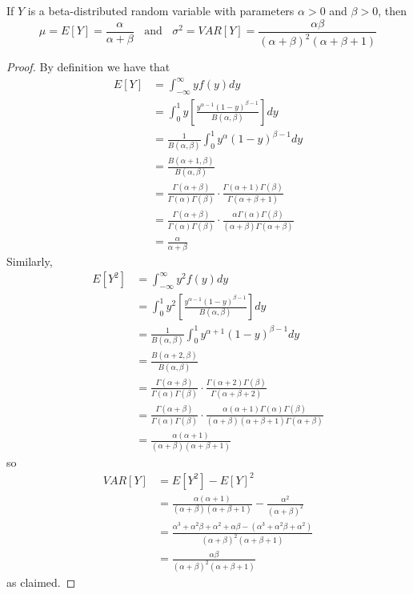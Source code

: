 \documentclass[12pt, a4paper, twoside, openright, titlepage]{book}
\begin{document}
\begin{thm}{}{}
    If $Y$ is a beta-distributed random variable with parameters $\alpha > 0$ and $\beta > 0$, then \begin{equation*}
        \mu = E[Y] = \frac{\alpha}{\alpha + \beta} \;\;\text{ and }\;\;\sigma^2 = VAR[Y] = \frac{\alpha\beta}{(\alpha+\beta)^2(\alpha+\beta+1)}
    \end{equation*}
\end{thm}
\begin{proof}{}{}
    By definition we have that \begin{align*}
        E[Y] &= \int_{-\infty}^{\infty}yf(y)dy \\
        &= \int_0^1y\left[\frac{y^{\alpha-1}(1-y)^{\beta-1}}{B(\alpha,\beta)}\right]dy \\
        &= \frac{1}{B(\alpha,\beta)}\int_0^1y^{\alpha}(1-y)^{\beta-1}dy \\
        &= \frac{B(\alpha+1,\beta)}{B(\alpha,\beta)} \\
        &= \frac{\Gamma(\alpha+\beta)}{\Gamma(\alpha)\Gamma(\beta)}\cdot\frac{\Gamma(\alpha+1)\Gamma(\beta)}{\Gamma(\alpha+\beta+1)} \\
        &=\frac{\Gamma(\alpha+\beta)}{\Gamma(\alpha)\Gamma(\beta)}\cdot\frac{\alpha\Gamma(\alpha)\Gamma(\beta)}{(\alpha+\beta)\Gamma(\alpha+\beta)} \\ 
        &= \frac{\alpha}{\alpha+\beta}
    \end{align*}
    Similarly, \begin{align*}
        E[Y^2] &= \int_{-\infty}^{\infty}y^2f(y)dy \\
        &= \int_0^1y^2\left[\frac{y^{\alpha-1}(1-y)^{\beta-1}}{B(\alpha,\beta)}\right]dy \\
        &= \frac{1}{B(\alpha,\beta)}\int_0^1y^{\alpha+1}(1-y)^{\beta-1}dy \\
        &= \frac{B(\alpha+2,\beta)}{B(\alpha,\beta)} \\
        &= \frac{\Gamma(\alpha+\beta)}{\Gamma(\alpha)\Gamma(\beta)}\cdot\frac{\Gamma(\alpha+2)\Gamma(\beta)}{\Gamma(\alpha+\beta+2)} \\
        &=\frac{\Gamma(\alpha+\beta)}{\Gamma(\alpha)\Gamma(\beta)}\cdot\frac{\alpha(\alpha+1)\Gamma(\alpha)\Gamma(\beta)}{(\alpha+\beta)(\alpha+\beta+1)\Gamma(\alpha+\beta)} \\ 
        &= \frac{\alpha(\alpha+1)}{(\alpha+\beta)(\alpha+\beta+1)}
    \end{align*}
    so \begin{align*}
        VAR[Y] &= E[Y^2] - E[Y]^2 \\
        &= \frac{\alpha(\alpha+1)}{(\alpha+\beta)(\alpha+\beta+1)} - \frac{\alpha^2}{(\alpha+\beta)^2} \\
        &= \frac{\alpha^3+\alpha^2\beta+\alpha^2+\alpha\beta-(\alpha^3+\alpha^2\beta+\alpha^2)}{(\alpha+\beta)^2(\alpha+\beta+1)} \\
        &= \frac{\alpha\beta}{(\alpha+\beta)^2(\alpha+\beta+1)}
    \end{align*}
    as claimed.
\end{proof}
\end{document}
